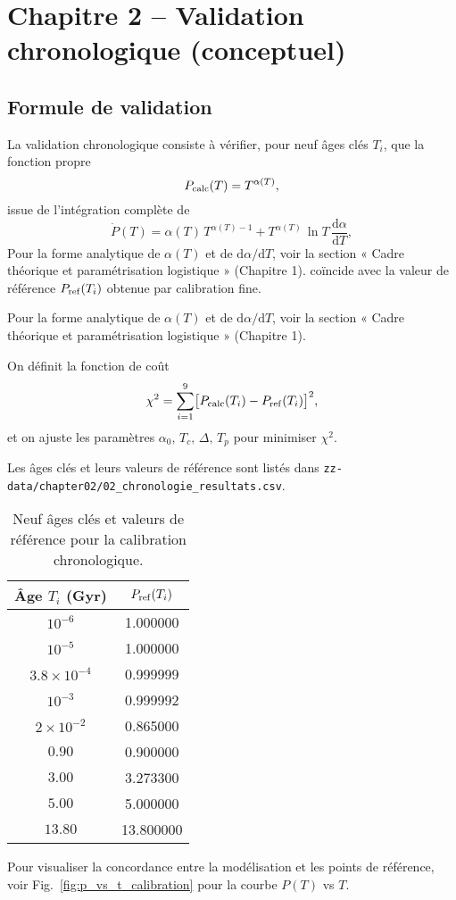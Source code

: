 \section{Chapitre 2 – Validation chronologique (conceptuel)}

\subsection{Formule de validation}

La validation chronologique consiste à vérifier, pour neuf âges clés \(T_{i}\), que la fonction propre
\[
  P_{\rm calc}(T)
  = T^{\alpha(T)},
\]
issue de l’intégration complète de
\[
  \dot P(T)
  = \alpha(T)\,T^{\alpha(T)-1}
  + T^{\alpha(T)}\,\ln T\,\frac{\mathrm d\alpha}{\mathrm dT},
\]
Pour la forme analytique de $\alpha(T)$ et de $\mathrm d\alpha/\mathrm dT$, voir la section « Cadre théorique et paramétrisation logistique » (Chapitre 1).
coïncide avec la valeur de référence \(P_{\rm ref}(T_i)\) obtenue par calibration fine.

Pour la forme analytique de $\alpha(T)$ et de $\mathrm d\alpha/\mathrm dT$, voir la section « Cadre théorique et paramétrisation logistique » (Chapitre 1).

On définit la fonction de coût
\[
  \chi^{2}
  = \sum_{i=1}^{9}
    \bigl[P_{\rm calc}(T_{i}) - P_{\rm ref}(T_{i})\bigr]^{2},
\]
et on ajuste les paramètres
\(\alpha_{0},\,T_{c},\,\Delta,\,T_{p}\)
pour minimiser \(\chi^{2}\).

Les âges clés et leurs valeurs de référence sont listés dans
\texttt{zz-data/chapter02/02\_chronologie\_resultats.csv}.

\begin{table}[htbp]
  \centering
  \begin{tabular}{cc}
    \toprule
    Âge \(T_i\) (Gyr) & \(P_{\rm ref}(T_i)\)    \\
    \midrule
    \(10^{-6}\)           & 1.000000    \\
    \(10^{-5}\)           & 1.000000    \\
    \(3.8 \times 10^{-4}\)& 0.999999    \\
    \(10^{-3}\)           & 0.999992    \\
    \(2\times10^{-2}\)    & 0.865000    \\
    \(0.90\)              & 0.900000    \\
    \(3.00\)              & 3.273300    \\
    \(5.00\)              & 5.000000    \\
    \(13.80\)             & 13.800000   \\
    \bottomrule
  \end{tabular}
  \caption{Neuf âges clés et valeurs de référence pour la calibration chronologique.}
  \label{tab:jalons_chap2}
\end{table}
Pour visualiser la concordance entre la modélisation et les points de référence, voir Fig.~\ref{fig:p_vs_t_calibration} pour la courbe \(P(T)\) vs \(T\).

